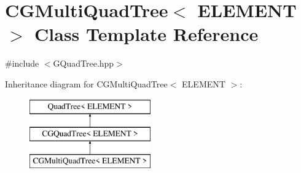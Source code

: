 \hypertarget{class_c_g_multi_quad_tree}{}\section{C\+G\+Multi\+Quad\+Tree$<$ E\+L\+E\+M\+E\+N\+T $>$ Class Template Reference}
\label{class_c_g_multi_quad_tree}


{\ttfamily \#include $<$G\+Quad\+Tree.\+hpp$>$}

Inheritance diagram for C\+G\+Multi\+Quad\+Tree$<$ E\+L\+E\+M\+E\+N\+T $>$\+:\begin{figure}[H]
\begin{center}
\leavevmode
\includegraphics[height=3.000000cm]{class_c_g_multi_quad_tree}
\end{center}
\end{figure}
